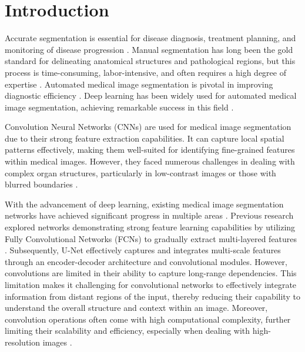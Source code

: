 \documentclass[sn-mathphys-num]{sn-jnl}
\theoremstyle{thmstyleone}%
\theoremstyle{thmstyletwo}%
\theoremstyle{thmstylethree}%
\begin{document}

\maketitle

\section{Introduction}\label{sec1}
Accurate segmentation is essential for disease diagnosis, treatment planning, and monitoring of disease progression \cite{de2018clinically,ouyang2020video}.
Manual segmentation has long been the gold standard for delineating anatomical structures and pathological regions, but this process is time-consuming, labor-intensive, and often requires a high degree of expertise \cite{ma2024segment}.
Automated medical image segmentation is pivotal in improving diagnostic efficiency \cite{ponikowski20172016}.
Deep learning has been widely used for automated medical image segmentation, achieving remarkable success in this field \cite{wang2022medical}.

Convolution Neural Networks (CNNs) are used for medical image segmentation due to their strong feature extraction capabilities.
It can capture local spatial patterns effectively, making them well-suited for identifying fine-grained features within medical images.
However, they faced numerous challenges in dealing with complex organ structures, particularly in low-contrast images or those with blurred boundaries \cite{han2021transformer}.

With the advancement of deep learning, existing medical image segmentation networks have achieved significant progress in multiple areas \cite{ramesh2021review}.
Previous research explored networks demonstrating strong feature learning capabilities by utilizing Fully Convolutional Networks (FCNs) to gradually extract multi-layered features \cite{long2015fully}.
Subsequently, U-Net \cite{ronneberger2015u} effectively captures and integrates multi-scale features through an encoder-decoder architecture and convolutional modules.
However, convolutions are limited in their ability to capture long-range dependencies.
This limitation makes it challenging for convolutional networks to effectively integrate information from distant regions of the input, thereby reducing their capability to understand the overall structure and context within an image.
Moreover, convolution operations often come with high computational complexity, further limiting their scalability and efficiency, especially when dealing with high-resolution images \cite{maji2018reduction}.
\end{document}
